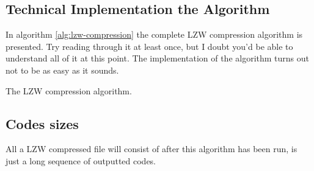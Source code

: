 \begin{refsection}
\section{Technical Implementation the Algorithm}
\label{sec:lzw-enc-algorithm}

In algorithm \ref{alg:lzw-compression} the complete LZW compression
algorithm is presented. Try reading through it at least once,
but I doubt you'd be able to understand all of it at this point. The
implementation of the algorithm turns out not to be as easy as it
sounds.

\begin{algorithm}[H]
  \caption{The LZW compression algorithm.}
  \label{alg:lzw-compression}
  \begin{algorithmic}[1]

    \State {}

    \While{\neof}

       \label{algl:hasingcheckintable}
         \label{algl:hasgetcode}
      \Else
        \State {}


          \State {}\label{algl:hashadd}

        \EndIf


      \EndIf


    \EndWhile

    \State {}
    \State {}
    \State {}  \label{algl:flush}
  \end{algorithmic}
\end{algorithm}

\subsection{Codes sizes}

All a LZW compressed file will consist of after this algorithm has
been run, is just a long sequence of outputted codes.


\end{refsection}
